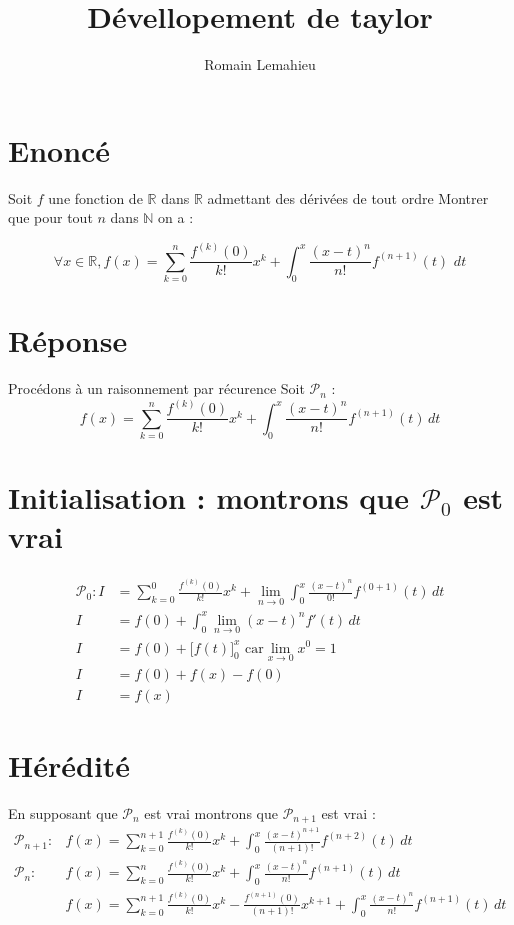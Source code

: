\documentclass{article}
\title{Dévellopement de taylor}
\author{Romain Lemahieu}
\newcommand*{\R}{\mathbb{R}}
\newcommand*{\N}{\mathbb{N}}
\newcommand*{\p}[1]{$\mathcal{P}_{#1}$}
\begin{document}
\maketitle
\section{Enoncé}
Soit $f$ une fonction de $\R$ dans $\R$
admettant des dérivées de tout ordre
Montrer que pour tout $n$ dans $\N$ on a :

$$
  \forall x \in \R, 
  f(x)=\sum_{k=0}^{n}\frac{f^{(k)}(0)}{k!}x^k
  +
  \int_{0}^{x}
  \frac{(x-t)^n}{n!}
  f^{(n+1)}(t)\,\,dt 
$$

\section{Réponse}
Procédons à un raisonnement par récurence
Soit \p{n} : 
$$
f(x)=\sum_{k=0}^{n} \frac{f^{(k)}(0)}{k!}x^k
+
\int_{0}^{x}
\frac{(x-t)^{n}}{n!}
f^{(n+1)}(t)\,dt 
$$

\section{Initialisation : montrons que \p{0} est vrai}
\begin{align*}
\mathcal{P}_{0} : I&=\sum_{k=0}^{0} \frac{f^{(k)}(0)}{k!}x^k
+
\lim_{n \to 0}
\int_{0}^{x}
\frac{(x-t)^{n}}{0!}
f^{(0+1)}(t)\,dt\\
I&=f(0)+
\int_{0}^{x}
\lim_{n \to 0}
(x-t)^{n}
f'(t)\,dt\\
I&=f(0)+\Big[f(t)\Big]_{0}^{x} \textrm{ car} \lim_{x \to 0}x^0=1\\
I&=f(0)+f(x)-f(0)\\
I&=f(x)
\end{align*}
\pagebreak
\section{Hérédité}
En supposant que \p{n} est vrai montrons que \p{n+1} est vrai :
\begin{align*}
\mathcal{P}_{n+1} : &f(x)=\sum_{k=0}^{n+1} \frac{f^{(k)}(0)}{k!}x^k+\int_{0}^{x}
\frac{(x-t)^{n+1}}{(n+1)!}
f^{(n+2)}(t)\,dt\\
\mathcal{P}_{n} :  &f(x)=\sum_{k=0}^{n} \frac{f^{(k)}(0)}{k!}x^k
+
\int_{0}^{x}
\frac{(x-t)^{n}}{n!}
f^{(n+1)}(t)\,dt\\
&f(x)=\sum_{k=0}^{n+1} \frac{f^{(k)}(0)}{k!}x^k
-
\frac{f^{(n+1)}(0)}{(n+1)!}x^{k+1}
+
\int_{0}^{x}
\frac{(x-t)^{n}}{n!}
f^{(n+1)}(t)\,dt
\end{align*}
\end{document}
